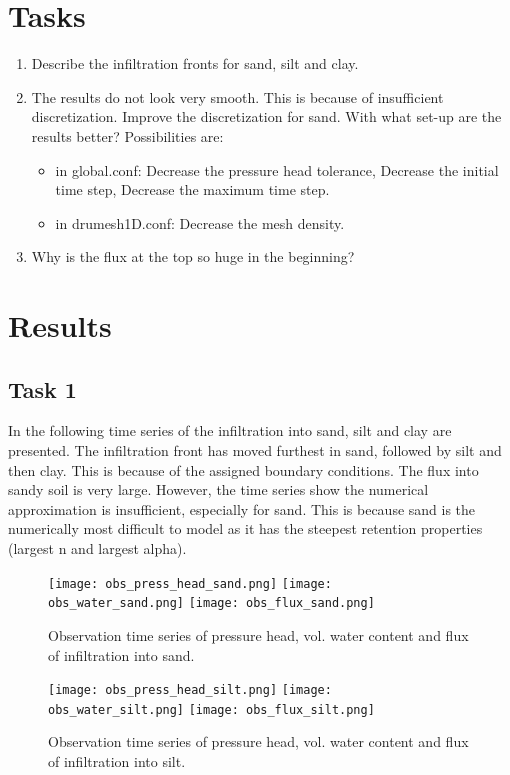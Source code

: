 \documentclass[
10pt, %
a4paper, %
oneside, %
headinclude,footinclude, %
BCOR5mm, %
]{scrartcl}
\begin{document}
\section*{Tasks}

\begin{enumerate}
\item Describe the infiltration fronts for sand, silt and clay.
\item The results do not look very smooth. This is because of insufficient discretization. Improve the discretization for sand. With what set-up are the results better? Possibilities are: 
\begin{itemize}
\item in global.conf: Decrease the pressure head tolerance, Decrease the initial time step, Decrease the maximum time step.
\item in drumesh1D.conf: Decrease the mesh density. 
\end{itemize}
\item Why is the flux at the top so huge in the beginning?
\end{enumerate}


\newpage
\newpage
\section*{Results}

\subsection*{Task 1}
In the following time series of the infiltration into sand, silt and clay are presented. The infiltration front has moved furthest in sand, followed by silt and then clay. This is because of the assigned boundary conditions. The flux into sandy soil is very large. However, the time series show the numerical approximation is insufficient, especially for sand. This is because sand is the numerically most difficult to model as it has the steepest retention properties (largest n and largest alpha).

\begin{figure}[!h]
\centering
\texttt{[image: obs\_press\_head\_sand.png]}
\texttt{[image: obs\_water\_sand.png]}
\texttt{[image: obs\_flux\_sand.png]}
\caption{Observation time series of pressure head, vol. water content and flux of infiltration into sand.}
\end{figure}

\begin{figure}[!h]
\centering
\texttt{[image: obs\_press\_head\_silt.png]}
\texttt{[image: obs\_water\_silt.png]}
\texttt{[image: obs\_flux\_silt.png]}
\caption{Observation time series of pressure head, vol. water content and flux of infiltration into silt.}

\end{figure}
\end{document}
